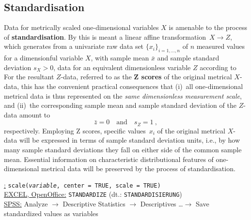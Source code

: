\subsection[Standardisation]{Standardisation}
Data for metrically scaled one-dimensional variables $X$ is 
amenable to the process of \textbf{standardisation}. By this is meant 
a linear affine transformation~$X \rightarrow Z$, which generates 
from a univariate raw data set $\{x_{i}\}_{i=1,\ldots,n}$ of $n$ 
measured values for a dimensionful variable $X$, with sample mean 
$\bar{x}$ and sample standard deviation $s_{X}>0$, data for an 
equivalent dimensionless variable $Z$ according to
%
\be
{}
\ee
%
For the resultant $Z$-data, referred to as the
\textbf{$\boldsymbol{Z}$ scores} of the original metrical $X$-data,
this has the convenient practical consequences that (i)~all 
one-dimensional metrical data is thus represented on the 
\textit{same dimensionless measurement scale}, and
(ii)~the corresponding sample mean and sample standard deviation of
the $Z$-data amount to
%
\[
\bar{z} = 0
\quad\text{and}\quad s_{Z}=1 \ ,
\]
%
respectively. Employing Z scores, specific values~$x_{i}$ of the
original metrical $X$-data will be expressed in terms of sample
standard deviation units, i.e., by how many sample standard
deviations they fall on either side of the common sample mean.
Essential information on characteristic distributional features of
one-dimensional metrical data will be preserved by the process of standardisation.

\medskip
\noindent
\underline{\R:} \texttt{scale(\textit{variable}, center = TRUE,
scale = TRUE)} \\
\underline{EXCEL, OpenOffice:} \texttt{STANDARDIZE} (dt.:
\texttt{STANDARDISIERUNG})\\
\underline{SPSS:} Analyze $\rightarrow$ Descriptive Statistics
$\rightarrow$ Descriptives \ldots $\rightarrow$ Save standardized 
values as variables

